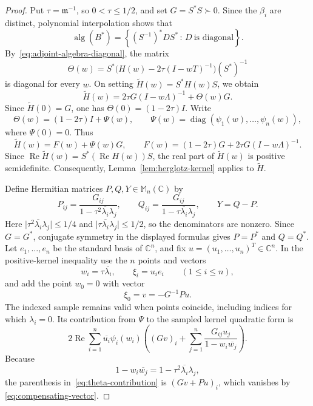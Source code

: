 \documentclass[preprints,article,submit,oneauthor]{Definitions/mdpi}
\theoremstyle{mdpi}
\theoremstyle{definition}
\newcommand{\C}{\mathbb C}
\newcommand{\Mn}{\mathbb M_n(\C)}
\newcommand{\alg}{\operatorname{alg}}
\newcommand{\RePart}{\operatorname{Re}}
\newcommand{\diag}{\operatorname{diag}}
\begin{document}
\begin{proof}
Put $\tau=\mathfrak m^{-1}$, so $0<\tau\leq1/2$, and set
$G=S^*S\succ0$.
Since the $\beta_i$ are distinct, polynomial interpolation shows that
\begin{equation}
  \alg(B^*)
  =\left\{(S^{-1})^* D S^* \,:\,
  D\ \text{is diagonal}\right\}.
  \label{eq:adjoint-algebra-diagonal}
\end{equation}
By~\eqref{eq:adjoint-algebra-diagonal}, the matrix
\[
  \Theta(w)=S^*\bigl(H(w)-2\tau(I-wT)^{-1}\bigr)(S^*)^{-1}
\]
is diagonal for every $w$.  On setting
$\widetilde H(w)=S^*H(w)S$, we obtain
\begin{equation}
  \widetilde H(w)=2\tau G(I-w\Lambda)^{-1}+\Theta(w)G.
  \label{eq:Htilde-decomposition}
\end{equation}
Since $\widetilde H(0)=G$, one has $\Theta(0)=(1-2\tau)I$.  Write
\[
  \Theta(w)=(1-2\tau)I+\Psi(w),
  \qquad
  \Psi(w)=\diag(\psi_1(w),\ldots,\psi_n(w)),
\]
where $\Psi(0)=0$.  Thus
\begin{equation}
  \widetilde H(w)=F(w)+\Psi(w)G,
  \qquad
  F(w)=(1-2\tau)G+2\tau G(I-w\Lambda)^{-1}.
  \label{eq:mass-H-decomposition}
\end{equation}
Since $\RePart\widetilde H(w)=S^*(\RePart H(w))S$, the real part of
$\widetilde H(w)$ is positive semidefinite.  Consequently,
Lemma~\ref{lem:herglotz-kernel} applies to $\widetilde H$.

Define Hermitian matrices $P,Q,Y\in\Mn$ by
\begin{equation}
  P_{ij}=\frac{G_{ij}}
  {1-\tau^2\overline{\lambda_i}\lambda_j},
  \qquad
  Q_{ij}=\frac{G_{ij}}
  {1-\tau\overline{\lambda_i}\lambda_j},
  \qquad
  Y=Q-P.
  \label{eq:PQY-definition}
\end{equation}
Here
$\lvert\tau^2\overline{\lambda_i}\lambda_j\rvert\leq1/4$ and
$\lvert\tau\overline{\lambda_i}\lambda_j\rvert\leq1/2$, so the
denominators are nonzero.  Since $G=G^*$, conjugate symmetry in the
displayed formulas gives $P=P^*$ and $Q=Q^*$.
Let $e_1,\ldots,e_n$ be the standard basis of $\C^n$, and fix
$u=(u_1,\ldots,u_n)^T\in\C^n$.  In the positive-kernel inequality use
the $n$ points and vectors
\begin{equation}
  w_i=\tau\overline{\lambda_i},\qquad
  \xi_i=u_i e_i\qquad(1\leq i\leq n),
  \label{eq:eigenvalue-samples}
\end{equation}
and add the point $w_0=0$ with vector
\begin{equation}
  \xi_0=v=-G^{-1}Pu.
  \label{eq:compensating-vector}
\end{equation}
The indexed sample remains valid when points coincide, including
indices for which $\lambda_i=0$.  Its contribution from $\Psi$ to the
sampled kernel quadratic form is
\begin{equation}
  2\RePart\sum_{i=1}^n
  \overline{u_i}\psi_i(w_i)
  \left(
    (Gv)_i+
    \sum_{j=1}^n
    \frac{G_{ij}u_j}{1-w_i\overline{w_j}}
  \right).
  \label{eq:theta-contribution}
\end{equation}
Because
\[
  1-w_i\overline{w_j}
  =1-\tau^2\overline{\lambda_i}\lambda_j,
\]
the parenthesis in~\eqref{eq:theta-contribution} is
$(Gv+Pu)_i$, which vanishes by~%
\eqref{eq:compensating-vector}.


\end{proof}
\end{document}
